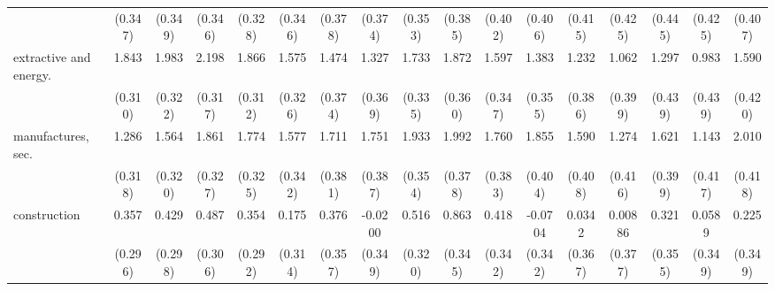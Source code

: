 {\begin{tabular}{l*{16}{c}}
                    &     (0.347)         &     (0.349)         &     (0.346)         &     (0.328)         &     (0.346)         &     (0.378)         &     (0.374)         &     (0.353)         &     (0.385)         &     (0.402)         &     (0.406)         &     (0.415)         &     (0.425)         &     (0.445)         &     (0.425)         &     (0.407)         \\
[1em]
extractive and energy.&       1.843\sym{***}&       1.983\sym{***}&       2.198\sym{***}&       1.866\sym{***}&       1.575\sym{***}&       1.474\sym{***}&       1.327\sym{***}&       1.733\sym{***}&       1.872\sym{***}&       1.597\sym{***}&       1.383\sym{***}&       1.232\sym{**} &       1.062\sym{**} &       1.297\sym{**} &       0.983\sym{*}  &       1.590\sym{***}\\
                    &     (0.310)         &     (0.322)         &     (0.317)         &     (0.312)         &     (0.326)         &     (0.374)         &     (0.369)         &     (0.335)         &     (0.360)         &     (0.347)         &     (0.355)         &     (0.386)         &     (0.399)         &     (0.439)         &     (0.439)         &     (0.420)         \\
[1em]
manufactures, sec.  &       1.286\sym{***}&       1.564\sym{***}&       1.861\sym{***}&       1.774\sym{***}&       1.577\sym{***}&       1.711\sym{***}&       1.751\sym{***}&       1.933\sym{***}&       1.992\sym{***}&       1.760\sym{***}&       1.855\sym{***}&       1.590\sym{***}&       1.274\sym{**} &       1.621\sym{***}&       1.143\sym{**} &       2.010\sym{***}\\
                    &     (0.318)         &     (0.320)         &     (0.327)         &     (0.325)         &     (0.342)         &     (0.381)         &     (0.387)         &     (0.354)         &     (0.378)         &     (0.383)         &     (0.404)         &     (0.408)         &     (0.416)         &     (0.399)         &     (0.417)         &     (0.418)         \\
[1em]
construction        &       0.357         &       0.429         &       0.487         &       0.354         &       0.175         &       0.376         &     -0.0200         &       0.516         &       0.863\sym{*}  &       0.418         &     -0.0704         &      0.0342         &     0.00886         &       0.321         &      0.0589         &       0.225         \\
                    &     (0.296)         &     (0.298)         &     (0.306)         &     (0.292)         &     (0.314)         &     (0.357)         &     (0.349)         &     (0.320)         &     (0.345)         &     (0.342)         &     (0.342)         &     (0.367)         &     (0.377)         &     (0.355)         &     (0.349)         &     (0.349)         \\

\end{tabular}}
